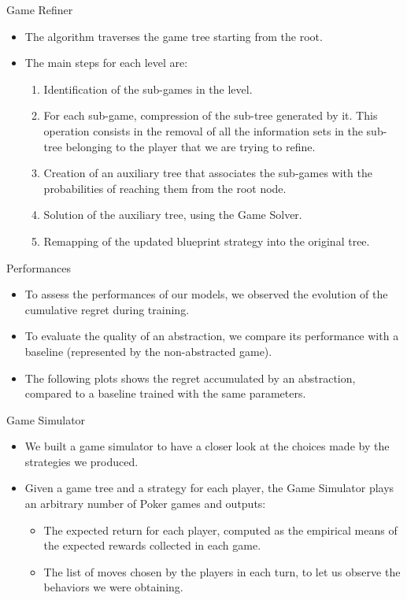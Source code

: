 \documentclass[11pt]{beamer}
\begin{document}
\begin{frame}{Game Refiner}
\begin{itemize}
\item The algorithm traverses the game tree starting from the root. 
\item The main steps for each level are:
\begin{enumerate}
\item Identification of the sub-games in the level.
\item For each sub-game, compression of the sub-tree generated by it. This operation consists in the removal of all the information sets in the sub-tree belonging to the player that we are trying to refine.
\item Creation of an auxiliary tree that associates the sub-games with the probabilities of reaching them from the root node.
\item Solution of the auxiliary tree, using the Game Solver.
\item Remapping of the updated blueprint strategy into the original tree.
\end{enumerate}
\end{itemize}
\end{frame}

\begin{frame}{Performances}
\begin{itemize}
\item To assess the performances of our models, we observed the evolution of the cumulative regret during training.
\item To evaluate the quality of an abstraction, we compare its performance with a baseline (represented by the non-abstracted game).
\item The following plots shows the regret accumulated by an abstraction, compared to a baseline trained with the same parameters.
\end{itemize}
\end{frame}

\begin{frame}{Game Simulator}
\begin{itemize}
\item We built a game simulator to have a closer look at the choices made by the strategies we produced.
\item Given a game tree and a strategy for each player, the Game Simulator plays an arbitrary number of Poker games and outputs:
\begin{itemize}
\item The expected return for each player, computed as the empirical means of the expected rewards collected in each game.
\item The list of moves chosen by the players in each turn, to let us observe the behaviors we were obtaining.
\end{itemize}
\end{itemize}
\end{frame}
\end{document}
